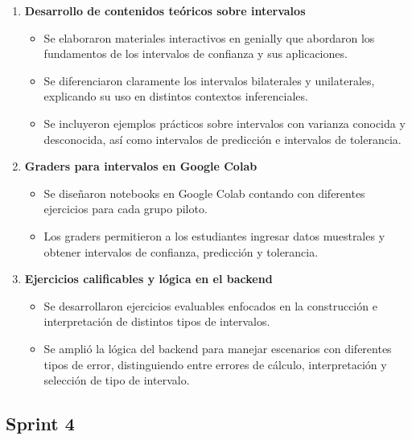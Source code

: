 \documentclass[letter,oneside,12pt,spanish]{report}
\begin{document}
\begin{enumerate}
	\item \textbf{Desarrollo de contenidos teóricos sobre intervalos}  
	\begin{itemize}
		\item Se elaboraron materiales interactivos en genially que abordaron los fundamentos de los intervalos de confianza y sus aplicaciones.
		\item Se diferenciaron claramente los intervalos bilaterales y unilaterales, explicando su uso en distintos contextos inferenciales.
		\item Se incluyeron ejemplos prácticos sobre intervalos con varianza conocida y desconocida, así como intervalos de predicción e intervalos de tolerancia.
	\end{itemize}
	
	\item \textbf{Graders para intervalos en Google Colab}  
	\begin{itemize}
		\item Se diseñaron notebooks en Google Colab contando con diferentes ejercicios para cada grupo piloto.
		\item Los graders permitieron a los estudiantes ingresar datos muestrales y obtener intervalos de confianza, predicción y tolerancia.
	\end{itemize}
	
	\item \textbf{Ejercicios calificables y lógica en el backend}  
	\begin{itemize}
		\item Se desarrollaron ejercicios evaluables enfocados en la construcción e interpretación de distintos tipos de intervalos.
		\item Se amplió la lógica del backend para manejar escenarios con diferentes tipos de error, distinguiendo entre errores de cálculo, interpretación y selección de tipo de intervalo.
	\end{itemize}
	
\end{enumerate}



\subsection{Sprint 4}
\end{document}
